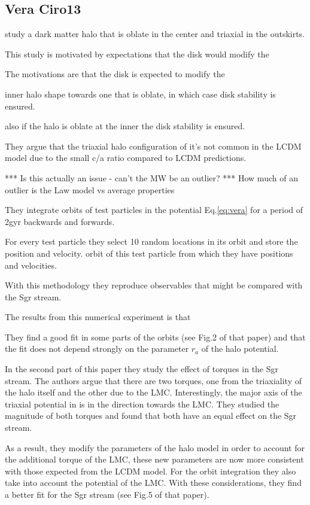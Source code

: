 \documentclass[12pt]{article}
\begin{document}
\subsection{Vera Ciro13}

\citep{Vera13} study a dark matter halo that is oblate in the center
 and triaxial in the outskirts. 

This study is motivated by expectations that the disk would modify the 

The motivations are that the disk is expected
 to modify the

 inner halo shape towards one that is oblate, in which case disk stability 
is ensured.  

also if the
halo is oblate at the inner the disk stability is ensured. 

They
argue that the triaxial halo configuration of \citep{Law10} it's
not common in the LCDM model due to the small c/a ratio compared to
LCDM predictions.

*** Is this actually an issue - can’t the MW be an outlier?   
***  How much of an outlier is the Law model vs average properties


They integrate orbits of test particles in the potential Eq.\ref{eq:vera} for a period
of 2gyr backwards and forwards. 

For every test particle they select 10 random locations 
in its orbit and store the position and velocity. 
orbit of this test particle from which they have positions and velocities.

 With this methodology they reproduce observables that might be compared with 
the Sgr stream.

The results from this numerical experiment is that 

They find  a good fit in some
parts of the orbits (see Fig.2 of that paper) and that the fit does not depend
strongly on the parameter $r_a$ of the halo potential.

In the second part of this paper they study the effect of torques in the Sgr
stream. The authors argue that there are two torques, one from the triaxiality
of the halo itself and the other due to the LMC. Interestingly, the major
axis of the triaxial potential in \citep{Law10} is in the direction towards
 the LMC. They studied the magnitude of both torques and found that both
have an equal effect on the Sgr stream.

As a result, they modify the parameters of the halo model in order to account
for the additional torque of the LMC, these new parameters are now more consistent
 with those expected from the LCDM model. For the orbit integration they also take
into account the potential of the LMC. With these considerations, they find a better fit for  the Sgr
stream (see Fig.5 of that paper).
\end{document}
